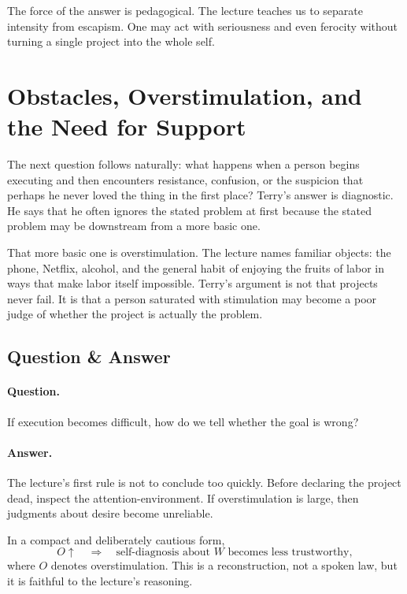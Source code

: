The force of the answer is pedagogical. The lecture teaches us to separate intensity from escapism. One may act with seriousness and even ferocity without turning a single project into the whole self.

\section{Obstacles, Overstimulation, and the Need for Support}

The next question follows naturally: what happens when a person begins executing and then encounters resistance, confusion, or the suspicion that perhaps he never loved the thing in the first place? Terry's answer is diagnostic. He says that he often ignores the stated problem at first because the stated problem may be downstream from a more basic one.

That more basic one is overstimulation. The lecture names familiar objects: the phone, Netflix, alcohol, and the general habit of enjoying the fruits of labor in ways that make labor itself impossible. Terry's argument is not that projects never fail. It is that a person saturated with stimulation may become a poor judge of whether the project is actually the problem.

\subsection{Question \& Answer}

\paragraph{Question.} If execution becomes difficult, how do we tell whether the goal is wrong?

\paragraph{Answer.} The lecture's first rule is not to conclude too quickly. Before declaring the project dead, inspect the attention-environment. If overstimulation is large, then judgments about desire become unreliable.

In a compact and deliberately cautious form,
\begin{equation}
O \uparrow \quad \Longrightarrow \quad \text{self-diagnosis about } W \text{ becomes less trustworthy},
\end{equation}
where \(O\) denotes overstimulation. This is a reconstruction, not a spoken law, but it is faithful to the lecture's reasoning.

